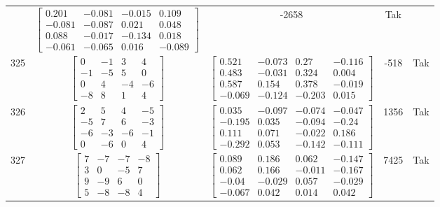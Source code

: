 \documentclass[a4paper,12pt]{article}
\begin{document}
\begin{tabular}{c c c c c}
&
$\begin{bmatrix} 0.201 & -0.081 & -0.015 & 0.109 \\ -0.081 & -0.087 & 0.021 & 0.048 \\ 0.088 & -0.017 & -0.134 & 0.018 \\ -0.061 & -0.065 & 0.016 & -0.089 \end{bmatrix}$
&
-2658
&
Tak
\\
325
&
$\begin{bmatrix} 0 & -1 & 3 & 4 \\ -1 & -5 & 5 & 0 \\ 0 & 4 & -4 & -6 \\ -8 & 8 & 1 & 4 \end{bmatrix}$
&
$\begin{bmatrix} 0.521 & -0.073 & 0.27 & -0.116 \\ 0.483 & -0.031 & 0.324 & 0.004 \\ 0.587 & 0.154 & 0.378 & -0.019 \\ -0.069 & -0.124 & -0.203 & 0.015 \end{bmatrix}$
&
-518
&
Tak
\\
326
&
$\begin{bmatrix} 2 & 5 & 4 & -5 \\ -5 & 7 & 6 & -3 \\ -6 & -3 & -6 & -1 \\ 0 & -6 & 0 & 4 \end{bmatrix}$
&
$\begin{bmatrix} 0.035 & -0.097 & -0.074 & -0.047 \\ -0.195 & 0.035 & -0.094 & -0.24 \\ 0.111 & 0.071 & -0.022 & 0.186 \\ -0.292 & 0.053 & -0.142 & -0.111 \end{bmatrix}$
&
1356
&
Tak
\\
327
&
$\begin{bmatrix} 7 & -7 & -7 & -8 \\ 3 & 0 & -5 & 7 \\ 9 & -9 & 6 & 0 \\ 5 & -8 & -8 & 4 \end{bmatrix}$
&
$\begin{bmatrix} 0.089 & 0.186 & 0.062 & -0.147 \\ 0.062 & 0.166 & -0.011 & -0.167 \\ -0.04 & -0.029 & 0.057 & -0.029 \\ -0.067 & 0.042 & 0.014 & 0.042 \end{bmatrix}$
&
7425
&
Tak
\\

\end{tabular}
\end{document}
